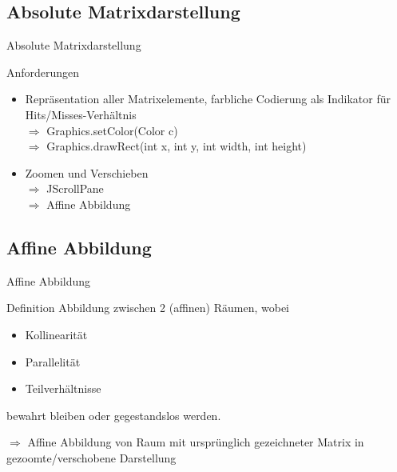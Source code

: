 \subsection{Absolute Matrixdarstellung}
\begin{frame}{Absolute Matrixdarstellung}
	\begin{block}{Anforderungen}
		\pause
		\begin{itemize}[<+->]
			\item Repräsentation aller Matrixelemente, farbliche Codierung als Indikator für Hits/Misses-Verhältnis\\\pause
				$\Rightarrow$ Graphics.setColor(Color c)\\
				$\Rightarrow$ Graphics.drawRect(int x, int y, int width, int height)\pause
			\item Zoomen und Verschieben\\\pause
			$\Rightarrow$ JScrollPane\\
			$\Rightarrow$ Affine Abbildung
		\end{itemize}
	\end{block}
\pause
\end{frame}

\subsection{Affine Abbildung}
\begin{frame}{Affine Abbildung}
	\begin{block}{Definition}
		Abbildung zwischen 2 (affinen) Räumen, wobei
		\pause
		\begin{itemize}[<+->]
			\item Kollinearität
			\item Parallelität
			\item Teilverhältnisse
		\end{itemize}
		bewahrt bleiben oder gegestandslos werden.
	\end{block}
\pause
$\Rightarrow$ Affine Abbildung von Raum mit ursprünglich gezeichneter Matrix in gezoomte/verschobene Darstellung
\end{frame}

